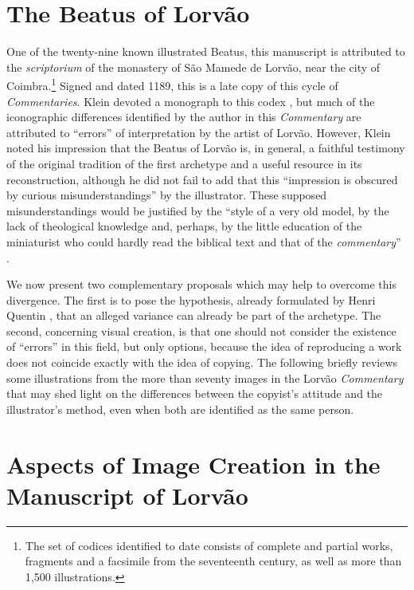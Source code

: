 \documentclass{article}
\begin{document}
\section*{The Beatus of Lorvão}

One of the twenty-nine known illustrated Beatus, this manuscript is
attributed to the \emph{scriptorium} of the monastery of São Mamede de
Lorvão, near the city of Coimbra.\footnote{The set of codices identified
  to date consists of complete and partial works, fragments and a
  facsimile from the seventeenth century, as well as more than 1,500
  illustrations.} Signed and dated 1189, this is a late copy of this
cycle of \emph{Commentaries}. Klein devoted a monograph to this codex \citep{klein_beato_2004}, but much of the iconographic differences identified by the
author in this \emph{Commentary} are attributed to ``errors'' of
interpretation by the artist of Lorvão. However, Klein noted his
impression that the Beatus of Lorvão is, in general, a faithful
testimony of the original tradition of the first archetype and a useful
resource in its reconstruction, although he did not fail to add that
this ``impression is obscured by curious misunderstandings'' \citep[42]{klein_beato_2004} by the illustrator. These supposed misunderstandings would be
justified by the ``style of a very old model, by the lack of theological
knowledge and, perhaps, by the little education of the miniaturist who
could hardly read the biblical text and that of the \emph{commentary}''
\citep[42]{klein_beato_2004}.

We now present two complementary proposals which may help to overcome
this divergence. The first is to pose the hypothesis, already formulated
by Henri Quentin \citeyearpar{quentin_essais_1926}, that an alleged variance can already be part of the archetype. The second, concerning visual creation, is that one
should not consider the existence of ``errors'' in this field, but only
options, because the idea of reproducing a work does not coincide
exactly with the idea of copying. The following briefly reviews some
illustrations from the more than seventy images in the Lorvão
\emph{Commentary} that may shed light on the differences between the
copyist's attitude and the illustrator's method, even when both are
identified as the same person.

\section*{Aspects of Image Creation in the Manuscript of Lorvão}
\end{document}
